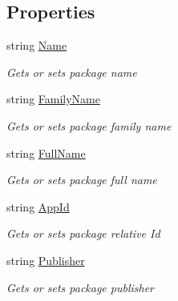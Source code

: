 \subsection*{Properties}
\begin{DoxyCompactItemize}
\item 
string \hyperlink{class_microsoft_1_1_tools_1_1_windows_device_portal_1_1_device_portal_1_1_package_info_a0201d5eba254c9ca397d406fc9372a87}{Name}
\begin{DoxyCompactList}\small\item\em Gets or sets package name \end{DoxyCompactList}\item 
string \hyperlink{class_microsoft_1_1_tools_1_1_windows_device_portal_1_1_device_portal_1_1_package_info_a8b0f47bd4c2ae9caba3b8c209e26420e}{Family\+Name}
\begin{DoxyCompactList}\small\item\em Gets or sets package family name \end{DoxyCompactList}\item 
string \hyperlink{class_microsoft_1_1_tools_1_1_windows_device_portal_1_1_device_portal_1_1_package_info_a3c2a452a242fe881e6e59b50e3ae33b9}{Full\+Name}
\begin{DoxyCompactList}\small\item\em Gets or sets package full name \end{DoxyCompactList}\item 
string \hyperlink{class_microsoft_1_1_tools_1_1_windows_device_portal_1_1_device_portal_1_1_package_info_a122708dbdb7194f05253ba861e97e727}{App\+Id}
\begin{DoxyCompactList}\small\item\em Gets or sets package relative Id \end{DoxyCompactList}\item 
string \hyperlink{class_microsoft_1_1_tools_1_1_windows_device_portal_1_1_device_portal_1_1_package_info_a1ba0070ecf9d281591439f75ce5e7af8}{Publisher}
\begin{DoxyCompactList}\small\item\em Gets or sets package publisher \end{DoxyCompactList}\item 

\end{DoxyCompactItemize}
